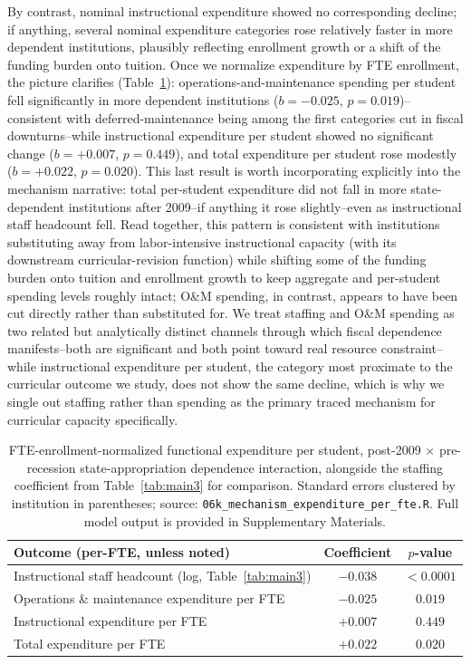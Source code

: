 \documentclass[11pt, letterpaper]{article}
\begin{document}
By contrast, nominal instructional expenditure showed no corresponding decline; if anything, several nominal expenditure categories rose relatively faster in more dependent institutions, plausibly reflecting enrollment growth or a shift of the funding burden onto tuition. Once we normalize expenditure by FTE enrollment, the picture clarifies (Table~\ref{tab:main4}): operations-and-maintenance spending per student fell significantly in more dependent institutions ($b=-0.025$, $p=0.019$)--consistent with deferred-maintenance being among the first categories cut in fiscal downturns--while instructional expenditure per student showed no significant change ($b=+0.007$, $p=0.449$), and total expenditure per student rose modestly ($b=+0.022$, $p=0.020$). This last result is worth incorporating explicitly into the mechanism narrative: total per-student expenditure did not fall in more state-dependent institutions after 2009--if anything it rose slightly--even as instructional staff headcount fell. Read together, this pattern is consistent with institutions substituting away from labor-intensive instructional capacity (with its downstream curricular-revision function) while shifting some of the funding burden onto tuition and enrollment growth to keep aggregate and per-student spending levels roughly intact; O\&M spending, in contrast, appears to have been cut directly rather than substituted for. We treat staffing and O\&M spending as two related but analytically distinct channels through which fiscal dependence manifests--both are significant and both point toward real resource constraint--while instructional expenditure per student, the category most proximate to the curricular outcome we study, does not show the same decline, which is why we single out staffing rather than spending as the primary traced mechanism for curricular capacity specifically.

\begin{table}[H]
\centering
\caption{FTE-enrollment-normalized functional expenditure per student, post-2009 $\times$ pre-recession state-appropriation dependence interaction, alongside the staffing coefficient from Table~\ref{tab:main3} for comparison. Standard errors clustered by institution in parentheses; source: \texttt{06k\_mechanism\_expenditure\_per\_fte.R}. Full model output is provided in Supplementary Materials.}
\label{tab:main4}
\begin{threeparttable}
\begin{tabular}{lcc}
\toprule
Outcome (per-FTE, unless noted) & Coefficient & $p$-value \\
\midrule
Instructional staff headcount (log, Table~\ref{tab:main3}) & $-0.038$ & $<0.0001$ \\
Operations \& maintenance expenditure per FTE & $-0.025$ & $0.019$ \\
Instructional expenditure per FTE & $+0.007$ & $0.449$ \\
Total expenditure per FTE & $+0.022$ & $0.020$ \\
\bottomrule
\end{tabular}
\end{threeparttable}
\end{table}
\end{document}
